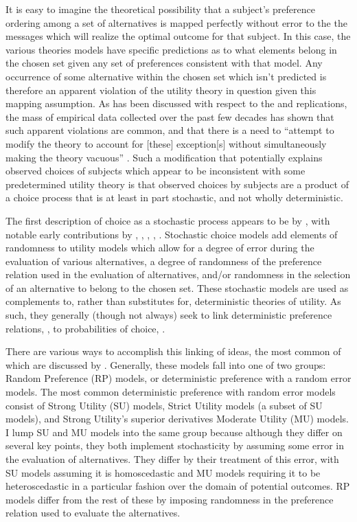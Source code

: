 It is easy to imagine the theoretical possibility that a subject's preference ordering among a set of alternatives is mapped perfectly without error to the the messages which will realize the optimal outcome for that subject.
In this case, the various theories models have specific predictions as to what elements belong in the chosen set given any set of preferences consistent with that model.
Any occurrence of some alternative within the chosen set which isn't predicted is therefore an apparent violation of the utility theory in question given this mapping assumption.
As has been discussed with respect to the \textcite{Grether1979} and \textcite{Holt2002} replications, the mass of empirical data collected over the past few decades has shown that such apparent violations are common, and that there is a need to \enquote{attempt to modify the theory to account for [these] exception[s] without simultaneously making the theory vacuous} \textcite[634]{Grether1979}.
Such a modification that potentially explains observed choices of subjects which appear to be inconsistent with some predetermined utility theory is that observed choices by subjects are a product of a choice process that is at least in part stochastic, and not wholly deterministic.


The first description of choice as a stochastic process appears to be by \textcite{Edwards1954}, with notable early contributions by \textcite{Luce1958}, \textcite{Debreu1958}, \textcite{Davidson1959}, \textcite{Becker1963}, \textcite{Luce1965}.
Stochastic choice models add elements of randomness to utility models which allow for a degree of error during the evaluation of various alternatives, a degree of randomness of the preference relation used  in the evaluation of alternatives, and/or randomness in the selection of an alternative to belong to the chosen set.
These stochastic models are used as complements to, rather than substitutes for, deterministic theories of utility.
As such, they generally (though not always) seek to link deterministic preference relations, , to probabilities of choice, .

There are various ways to accomplish this linking of ideas, the most common of which are discussed by \textcite{Wilcox2008}.
Generally, these models fall into one of two groups: Random Preference (RP) models, or deterministic preference with a random error models.
The most common deterministic preference with random error models consist of Strong Utility (SU) models, Strict Utility models (a subset of SU models), and Strong Utility's superior derivatives Moderate Utility (MU) models.
I lump SU and MU models into the same group because although they differ on several key points, they both implement stochasticity by assuming some error in the evaluation of alternatives.
They differ by their treatment of this error, with SU models assuming it is homoscedastic and MU models requiring it to be heteroscedastic in a particular fashion over the domain of potential outcomes.
RP models differ from the rest of these by imposing randomness in the preference relation used to evaluate the alternatives.

